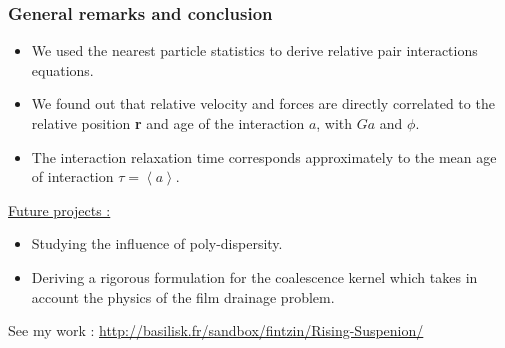 \documentclass{sintefbeamer}
\newcommand{\avg}[1]{\left<#1\right>}
\begin{document}
\begin{frame}
  \frametitle{General remarks and conclusion}

  \begin{itemize}
    \item We used the nearest particle statistics to derive relative pair interactions equations. 
    \item We found out that relative velocity and forces are directly correlated to the relative position \textbf{r} and age of the interaction $a$, with $Ga$ and $\phi$. 
    \item The interaction relaxation time corresponds approximately to the mean age of interaction $\tau =\avg{a}$. 
  \end{itemize}
    \underline{Future projects : }  
    \begin{itemize}
      \item Studying the influence of poly-dispersity. 
      \item Deriving a rigorous formulation for the coalescence kernel which takes in account the physics of the film drainage problem. 
    \end{itemize}
\vfill    
See my work : \url{http://basilisk.fr/sandbox/fintzin/Rising-Suspenion/}

\end{frame}
\end{document}
